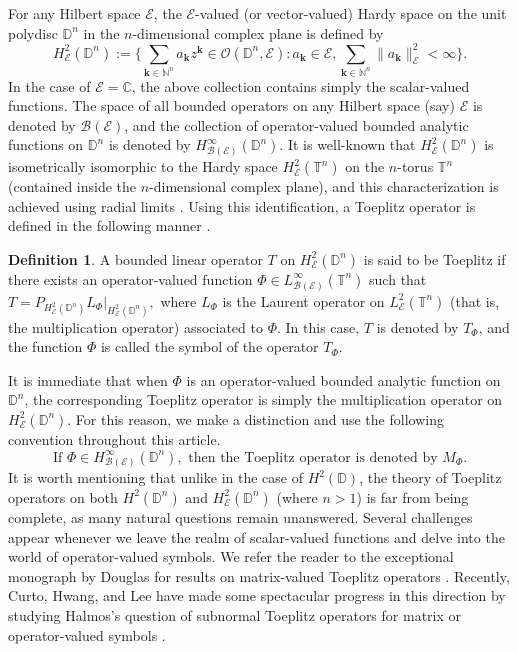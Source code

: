 \documentclass[12pt]{amsart}
\theoremstyle{definition}
\newtheorem{defn}[propn]{Definition}
\newcommand{\Nat}{\mathbb{N}}
\newcommand{\D}{\mathbb{D}}
\newcommand{\1}{{\mbox{\bf 1}}}
\newcommand{\clb}{\mathcal{B}}
\newcommand{\cle}{\mathcal{E}}
\begin{document}
For any Hilbert space $\cle$, the $\cle$-valued (or vector-valued) Hardy space on the unit polydisc $\D^n$ in the $n$-dimensional complex plane is defined by
\[
H_{\cle}^2(\D^n) := \big \{\sum_{\bm{k} \in \Nat^n} a_{\bm{k}} z^{\bm{k}} \in \mathcal{O}(\D^n,\cle): a_{\bm{k}} \in \cle,  \sum_{\bm{k} \in \Nat^n} \|a_{\bm{k}}\|_{\cle}^2 < \infty \big \}.
\]
In the case of $\cle = \mathbb{C}$, the above collection contains simply the scalar-valued functions. The space of all bounded operators on any Hilbert space (say) $\cle$ is denoted by $\clb(\cle)$, and the collection of operator-valued bounded analytic functions on $\D^n$ is denoted by $H_{\clb(\cle)}^{\infty}(\D^n)$. It is well-known that $H_{\cle}^2(\D^n)$ is isometrically isomorphic to the Hardy space $H_{\cle}^2(\mathbb{T}^n)$ on the $n$-torus $\mathbb{T}^n$ (contained inside the $n$-dimensional complex plane), and this characterization is achieved using radial limits \cite{NF}. Using this identification, a Toeplitz operator is defined in the following manner \cite{Douglas}.
\begin{defn}
A bounded linear operator $T$ on $H_{\cle}^2(\D^n)$ is said to be Toeplitz if there exists an operator-valued function $\Phi \in L_{\clb(\cle)}^{\infty}(\mathbb{T}^n)$ such that $T = P_{H_{\cle}^2(\D^n)} L_{\Phi}|_{H_{\cle}^2(\D^n)},$ where $L_{\Phi}$ is the Laurent operator on $L_{\cle}^2(\mathbb{T}^n)$ (that is, the multiplication operator) associated to $\Phi.$ In this case, $T$ is denoted by $T_{\Phi}$, and the function $\Phi$ is called the symbol of the operator $T_{\Phi}.$
\end{defn}
It is immediate that when $\Phi$ is an operator-valued bounded analytic function on $\D^n$, the corresponding Toeplitz operator is simply the multiplication operator on $H_{\cle}^2(\D^n)$. For this reason, we make a distinction and use the following convention throughout this article.
\[
\text{If } \Phi \in H_{\clb(\cle)}^{\infty}(\D^n), \text{ then the Toeplitz operator is denoted by } M_{\Phi}.
\]
It is worth mentioning that unlike in the case of $H^2(\D)$, the theory of Toeplitz operators on both $H^2(\D^n)$ and $H_{\cle}^2(\D^n)$ (where $n>1$) is far from being complete, as many natural questions remain unanswered. Several challenges appear whenever we leave the realm of scalar-valued functions and delve into the world of operator-valued symbols.  We refer the reader to the exceptional monograph by Douglas for results on matrix-valued Toeplitz operators \cite{Douglas}. Recently, Curto, Hwang, and Lee have made some spectacular progress in this direction by studying Halmos's question of subnormal Toeplitz operators for matrix or operator-valued symbols \cite{CHL, CHL2, CHL3}.  
\end{document}
